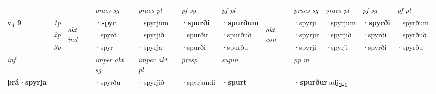 \begin{longtable}[l]{X>{\footnotesize\itshape}llXXXXlXXXX}
 & &   & \textit{praes sg}  & \textit{praes pl}    & \textit{ pf sg} & \textit{pf pl} & & \textit{praes sg}  & \textit{praes pl}    & \textit{pf sg} & \textit{pf pl }  \\ \cmidrule{4-7} \cmidrule{9-12}
 \multirow{2}{*}{{{\textbf{v{\textsubscript{4}}} \Large{\textbf{9}}}}}  & 1p & \multirow{3}{*}{\begin{turn}{90}\textit{akt ind}\end{turn}} & \textbf{·spyr} & ·spyrjum & \textbf{·spurði} & \textbf{·spurðum} & \multirow{3}{*}{\begin{turn}{90}\textit{akt con}\end{turn}} &·spyrji & ·spyrjum & \textbf{·spyrði} & ·spyrðum\\*
 & 2p &  &  ·spyrð  & ·spyrjið & ·spurðir & ·spurðuð & & ·spyrjir & ·spyrjið & ·spyrði & ·spyrðuð \\*
 & 3p &  & ·spyr & ·spyrja & ·spurði & ·spurðu & & ·spyrji & ·spyrji& ·spyrði & ·spyrðu \\*
\cmidrule{4-7} \cmidrule{9-12}

   {\textit{inf}} & &  & \textit{imper akt sg} & \textit{imper akt pl}   & \textit{presp} & \textit{supin}  && \textit{pp m} \\*
  {\textbf{þrá\allowbreak ·spyrja}} & && ·spyrðu  & ·spyrjið   & ·spyrjandi &  \textbf{·spurt}  && \multicolumn{2}{l}{\textbf{·spurður} adj\textbf{\textsubscript{2-1}}} \\*

\midrule


\end{longtable}
